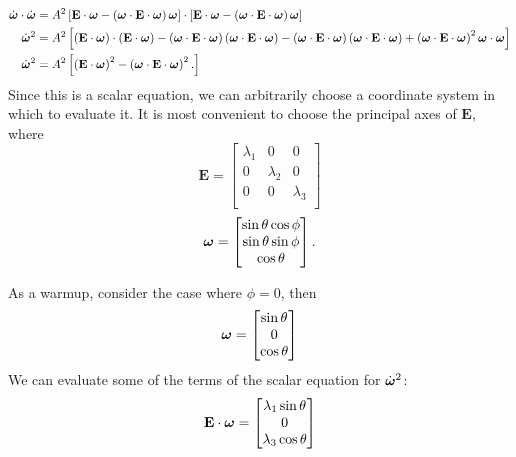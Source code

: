 \documentclass[extra,mreferee]{gji}
\begin{document}
\begin{equation}
\begin{aligned}
\dot{\mitbf{\omega}} \cdot \dot{\mitbf{\omega}} &= 
A^2 \left[ \mathbf{E}\cdot \mitbf{\omega} - \left(\mitbf{\omega} \cdot \mathbf{E} \cdot \mitbf{\omega} \right)\mitbf{\omega}\right]
\cdot \left[ \mathbf{E}\cdot \mitbf{\omega} - \left(\mitbf{\omega} \cdot \mathbf{E} \cdot \mitbf{\omega} \right)\mitbf{\omega}\right] \\
\dot{\mitbf{\omega}}^2  &= 
A^2 \left[ \left(\mathbf{E}\cdot \mitbf{\omega}\right)\cdot \left(\mathbf{E}\cdot \mitbf{\omega}\right)
 - \left(\mitbf{\omega} \cdot \mathbf{E} \cdot \mitbf{\omega} \right) \left( \mitbf{\omega}\cdot \mathbf{E} \cdot \mitbf{\omega} \right) 
 - \left(\mitbf{\omega} \cdot \mathbf{E} \cdot \mitbf{\omega} \right) \left( \mitbf{\omega}\cdot \mathbf{E} \cdot \mitbf{\omega} \right) 
 + \left(\mitbf{\omega} \cdot \mathbf{E} \cdot \mitbf{\omega} \right)^2 \mitbf{\omega}\cdot \mitbf{\omega} 
\right]\\
\dot{\mitbf{\omega}}^2  &= 
A^2 \left[ \left(\mathbf{E}\cdot \mitbf{\omega}\right)^2
 - \left(\mitbf{\omega} \cdot \mathbf{E} \cdot \mitbf{\omega} \right)^2.
\right]\\
\end{aligned}
\end{equation}
Since this is a scalar equation, we can arbitrarily choose a coordinate system in which to evaluate it.
It is most convenient to choose the principal axes of $\mathbf{E}$, where
\begin{equation}
\mathbf{E} = 
\begin{bmatrix}
\lambda_1 & 0 & 0 \\
0 & \lambda_2 & 0 \\
0 & 0 & \lambda_3 \\
\end{bmatrix}
\end{equation}
\begin{equation}
\mitbf{\omega} = 
\begin{bmatrix}
\sin{\theta} \cos{\phi} \\
\sin{\theta} \sin{\phi} \\
\cos{\theta} \\
\end{bmatrix}.
\end{equation}

As a warmup, consider the case where $\phi = 0$, then  
\begin{equation}
\mitbf{\omega} = 
\begin{bmatrix}
\sin{\theta}  \\
0 \\
\cos{\theta} \\
\end{bmatrix}
\end{equation}
We can evaluate some of the terms of the scalar equation for $\dot{\mitbf{\omega}}^2$:
\begin{equation}
\mathbf{E}\cdot \mitbf{\omega} = 
\begin{bmatrix}
\lambda_1 \sin{\theta} \\
0 \\
\lambda_3 \cos{\theta}
\end{bmatrix}
\end{equation}
\end{document}
